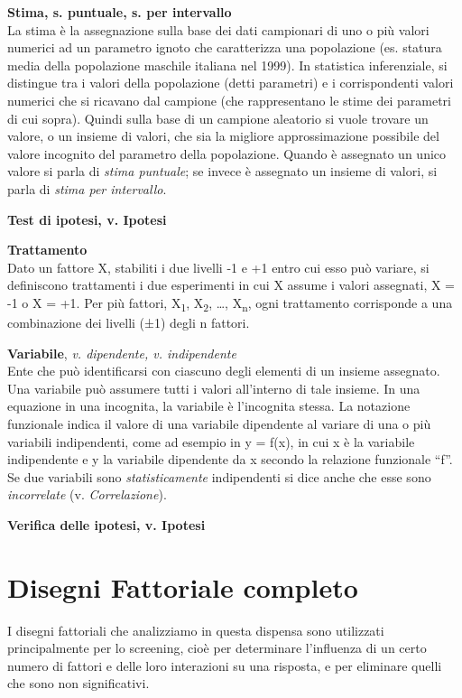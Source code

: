 \documentclass[
  11pt,
]{book}
\begin{document}
\textbf{Stima, s. puntuale, s. per intervallo}\\
La stima è la assegnazione sulla base dei dati campionari di uno o più valori numerici ad un parametro ignoto che caratterizza una popolazione (es. statura media della popolazione maschile italiana nel 1999).
In statistica inferenziale, si distingue tra i valori della popolazione (detti parametri) e i corrispondenti valori numerici che si ricavano dal campione (che rappresentano le stime dei parametri di cui sopra).
Quindi sulla base di un campione aleatorio si vuole trovare un valore, o un insieme di valori, che sia la migliore approssimazione possibile del valore incognito del parametro della popolazione.
Quando è assegnato un unico valore si parla di \emph{stima puntuale}; se invece è assegnato un insieme di valori, si parla di \emph{stima per intervallo}.

\textbf{Test di ipotesi, v. Ipotesi}

\textbf{Trattamento}\\
Dato un fattore X, stabiliti i due livelli -1 e +1 entro cui esso può variare, si definiscono trattamenti i due esperimenti in cui X assume i valori assegnati, X = -1 o X = +1.
Per più fattori, X\textsubscript{1}, X\textsubscript{2}, \ldots, X\textsubscript{n}, ogni trattamento corrisponde a una combinazione dei livelli (±1) degli n fattori.

\textbf{Variabile}, \emph{v. dipendente, v. indipendente}\\
Ente che può identificarsi con ciascuno degli elementi di un insieme assegnato.
Una variabile può assumere tutti i valori all'interno di tale insieme.
In una equazione in una incognita, la variabile è l'incognita stessa.
La notazione funzionale indica il valore di una variabile dipendente al variare di una o più variabili indipendenti, come ad esempio in y = f(x), in cui x è la variabile indipendente e y la variabile dipendente da x secondo la relazione funzionale ``f''.
Se due variabili sono \emph{statisticamente} indipendenti si dice anche che esse sono \emph{incorrelate} (v. \emph{Correlazione}).

\textbf{Verifica delle ipotesi, v. Ipotesi}

\hypertarget{disegni-fattoriale-completo}{%
\chapter{Disegni Fattoriale completo}\label{disegni-fattoriale-completo}}

I disegni fattoriali che analizziamo in questa dispensa sono utilizzati
principalmente per lo screening, cioè per determinare l'influenza di un
certo numero di fattori e delle loro interazioni su una risposta, e per
eliminare quelli che sono non significativi.
\end{document}
